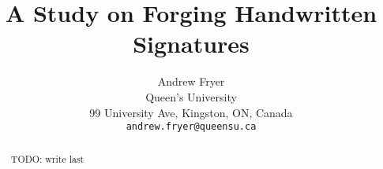 \documentclass[final]{cvpr}
\begin{document}
\title{A Study on Forging Handwritten Signatures}

\author{Andrew Fryer\\
Queen's University\\
99 University Ave, Kingston, ON, Canada\\
{\tt\small andrew.fryer@queensu.ca}
}

\maketitle


\begin{abstract}
   TODO: write last
\end{abstract}













{\small


}
\end{document}
